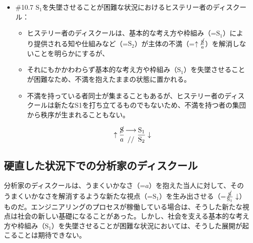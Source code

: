 \begin{note}{}
  \begin{itemize}
    \tightlist
    \item{\#10.7}
      $\textrm{S}_1$を失墜させることが困難な状況における\mbox{ヒステリー者のディスクール}：
      \begin{itemize}
          \tightlist
          \item
          \mbox{ヒステリー者のディスクール}は、基本的な考え方や枠組み（=$\textrm{S}_1$）により提供される知や仕組みなど（=$\textrm{S}_2$）が主体の不満（=$\uparrow\frac{\cancel{\textrm{S}}}{a}$）を解消しないことを明らかにするが、
          \item
          それにもかかわわらず基本的な考え方や枠組み（$\textrm{S}_1$）を失墜させることが困難なため、不満を抱えたままの状態に置かれる。
          \item
          不満を持っている者同士が集まることもあるが、\mbox{ヒステリー者のディスクール}は新たなS1を打ち立てるものでもないため、不満を持つ者の集団から秩序が生まれることもない。
        \end{itemize}

$$
\uparrow\frac{\cancel{\textrm{S}}}{a}\genfrac{}{}{0pt}{}{\longrightarrow}{//}\frac{\mathrm{S_1}}{\mathrm{S_2}}\downarrow
$$
  \end{itemize}
\end{note}

\subsection{硬直した状況下での分析家のディスクール}\label{ux786cux76f4ux3057ux305fux72b6ux6cc1ux4e0bux3067ux306eux5206ux6790ux5bb6ux306eux30c7ux30a3ux30b9ux30afux30fcux30eb}

\mbox{分析家のディスクール}は、うまくいかなさ（=\(a\)）を抱えた当人に対して、そのうまくいかなさを解消するような新たな視点（=\(\textrm{S}_1\)）を生み出させる（=\(\frac{\cancel{\textrm{S}}}{\textrm{S}_1}\downarrow\)）ものだ。\mbox{エンジニアリング}のプロセスが稼働している場合は、そうした新たな視点は社会の新しい基礎になることがあった。しかし、社会を支える基本的な考え方や枠組み（\(\textrm{S}_1\)）を失墜させることが困難な状況においては、そうした展開が起こることは期待できない。

